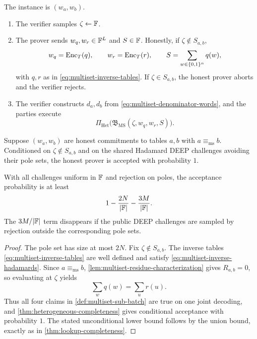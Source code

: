 \begin{definition}
\label{def:multiset-protocol}
The instance is $(w_a,w_b)$.
\begin{enumerate}[label=\textnormal{\arabic*.},leftmargin=*]
  \item The verifier samples $\zeta\leftarrow\mathbb{F}$.
  \item The prover sends $w_q,w_r\in\mathbb{F}^L$ and $S\in\mathbb{F}$.  Honestly, if $\zeta\notin S_{a,b}$,
  \begin{equation}
    w_q=\operatorname{Enc}_T(q),
    \qquad
    w_r=\operatorname{Enc}_T(r),
    \qquad
    S=\sum_{w\in\{0,1\}^n}q(w),
    \label{eq:multiset-honest-messages}
  \end{equation}
  with $q,r$ as in \eqref{eq:multiset-inverse-tables}.  If $\zeta\in S_{a,b}$, the honest prover aborts and the verifier rejects.
  \item The verifier constructs $d_a,d_b$ from \eqref{eq:multiset-denominator-words}, and the parties execute
  \begin{equation}
    \Pi_{\mathrm{Het}}
    \bigl(\mathfrak B_{\mathrm{MS}}(\zeta,w_q,w_r,S)\bigr).
    \label{eq:multiset-run-batch}
  \end{equation}
\end{enumerate}
\end{definition}

\begin{theorem}
\label{thm:multiset-completeness}
Suppose $(w_a,w_b)$ are honest commitments to tables $a,b$ with $a\equiv_{\mathrm{ms}}b$.  Conditioned on $\zeta\notin S_{a,b}$ and on the shared Hadamard DEEP challenges avoiding their pole sets, the honest prover is accepted with probability $1$.

With all challenges uniform in $\mathbb{F}$ and rejection on poles, the acceptance probability is at least
\begin{equation}
  1-\frac{2N}{|\mathbb{F}|}-\frac{3M}{|\mathbb{F}|}.
  \label{eq:multiset-completeness-bound}
\end{equation}
The $3M/|\mathbb{F}|$ term disappears if the public DEEP challenges are sampled by rejection outside the corresponding pole sets.
\end{theorem}

\begin{proof}
The pole set has size at most $2N$.  Fix $\zeta\notin S_{a,b}$.  The inverse tables \eqref{eq:multiset-inverse-tables} are well defined and satisfy \eqref{eq:multiset-inverse-hadamards}.  Since $a\equiv_{\mathrm{ms}}b$, \cref{lem:multiset-residue-characterization} gives $R_{a,b}=0$, so evaluating at $\zeta$ yields
\[
  \sum_w q(w)=\sum_u r(u).
\]
Thus all four claims in \cref{def:multiset-sub-batch} are true on one joint decoding, and \cref{thm:heterogeneous-completeness} gives conditional acceptance with probability $1$.  The stated unconditional lower bound follows by the union bound, exactly as in \cref{thm:lookup-completeness}.
\end{proof}

